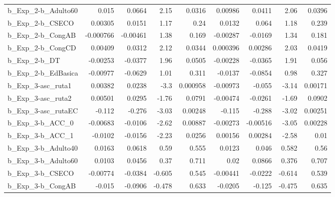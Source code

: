 \begin{tabular}{lrrrrrrrr}
b\_Exp\_2-b\_Adulto60         &       0.015 &       0.0664 &     2.15 &   0.0316 &    0.00986 &      0.0411 &         2.06 &        0.0396 \\
b\_Exp\_2-b\_CSECO            &     0.00305 &       0.0151 &     1.17 &     0.24 &     0.0132 &       0.064 &         1.18 &         0.239 \\
b\_Exp\_2-b\_CongAB           &   -0.000766 &     -0.00461 &     1.38 &    0.169 &   -0.00287 &     -0.0169 &         1.34 &         0.181 \\
b\_Exp\_2-b\_CongCD           &     0.00409 &       0.0312 &     2.12 &   0.0344 &   0.000396 &     0.00286 &         2.03 &        0.0419 \\
b\_Exp\_2-b\_DT               &    -0.00253 &      -0.0377 &     1.96 &   0.0505 &   -0.00228 &     -0.0365 &         1.91 &         0.056 \\
b\_Exp\_2-b\_EdBasica         &    -0.00977 &      -0.0629 &     1.01 &    0.311 &    -0.0137 &     -0.0854 &         0.98 &         0.327 \\
b\_Exp\_3-asc\_ruta1          &     0.00382 &       0.0238 &     -3.3 & 0.000958 &   -0.00973 &      -0.055 &        -3.14 &       0.00171 \\
b\_Exp\_3-asc\_ruta2          &     0.00501 &       0.0295 &    -1.76 &   0.0791 &   -0.00474 &     -0.0261 &        -1.69 &        0.0902 \\
b\_Exp\_3-asc\_rutaEC         &      -0.112 &       -0.276 &    -3.03 &  0.00248 &     -0.115 &      -0.288 &        -3.02 &       0.00251 \\
b\_Exp\_3-b\_ACC\_0            &    -0.00683 &      -0.0106 &    -2.62 &  0.00887 &   -0.00273 &    -0.00516 &        -3.05 &       0.00228 \\
b\_Exp\_3-b\_ACC\_1            &     -0.0102 &      -0.0156 &    -2.23 &   0.0256 &    0.00156 &     0.00284 &        -2.58 &          0.01 \\
b\_Exp\_3-b\_Adulto40         &      0.0163 &       0.0618 &     0.59 &    0.555 &     0.0123 &       0.046 &        0.582 &          0.56 \\
b\_Exp\_3-b\_Adulto60         &      0.0103 &       0.0456 &     0.37 &    0.711 &       0.02 &      0.0866 &        0.376 &         0.707 \\
b\_Exp\_3-b\_CSECO            &    -0.00774 &      -0.0384 &   -0.605 &    0.545 &   -0.00441 &     -0.0222 &       -0.614 &         0.539 \\
b\_Exp\_3-b\_CongAB           &      -0.015 &      -0.0906 &   -0.478 &    0.633 &    -0.0205 &      -0.125 &       -0.475 &         0.635 \\

\end{tabular}

